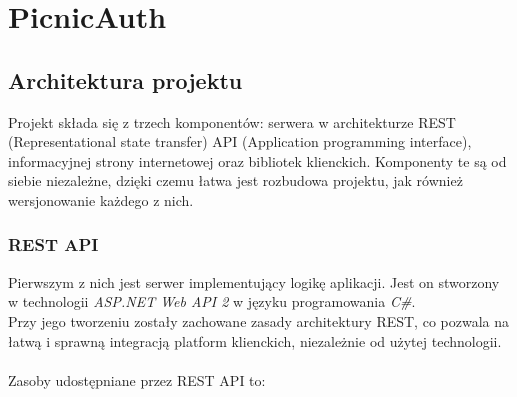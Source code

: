 \chapter{PicnicAuth}

\section{Architektura projektu}
Projekt składa się z trzech komponentów: serwera w architekturze REST (Representational state transfer) API (Application programming interface), 
informacyjnej strony internetowej oraz bibliotek klienckich. Komponenty te są od siebie niezależne, dzięki czemu 
łatwa jest rozbudowa projektu, jak również wersjonowanie każdego z nich.

\subsection{REST API}
Pierwszym z nich jest serwer implementujący logikę aplikacji. 
Jest on stworzony w technologii \textit{ASP.NET Web API 2} w języku programowania \textit{C\#}. \\
Przy jego tworzeniu zostały zachowane zasady architektury REST, co pozwala na łatwą i sprawną integracją
platform klienckich, niezależnie od użytej technologii. \\ \\
Zasoby udostępniane przez REST API to:
